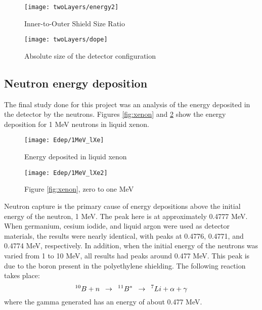 \documentclass[12pt]{article}
\begin{document}
\begin{figure}[H]
  \centering
  \begin{minipage}[t]{0.45\linewidth}
    \texttt{[image: twoLayers/energy2]}
    \caption{Inner-to-Outer Shield Size Ratio}
    \label{fig:energy2}
  \end{minipage}
  \quad
  \begin{minipage}[t]{0.45\linewidth}
    \texttt{[image: twoLayers/dope]}
    \caption{Absolute size of the detector configuration}
    \label{fig:dope}
  \end{minipage}
\end{figure}

\subsection{Neutron energy deposition}
The final study done for this project was an analysis of the energy deposited in the detector by the neutrons. Figures \ref{fig:xenon} and \ref{fig:xenon2} show the energy deposition for 1 MeV neutrons in liquid xenon.

\begin{figure}[H]
  \centering
  \begin{minipage}[t]{0.45\linewidth}
    \texttt{[image: Edep/1MeV\_lXe]}
    \caption{Energy deposited in liquid xenon}
    \label{fig:xenon}
  \end{minipage}
  \quad
  \begin{minipage}[t]{0.45\linewidth}
    \texttt{[image: Edep/1MeV\_lXe2]}
    \caption{Figure \ref{fig:xenon}, zero to one MeV}
    \label{fig:xenon2}
  \end{minipage}
\end{figure}

Neutron capture is the primary cause of energy depositions above the initial energy of the neutron, 1 MeV. The peak here is at approximately 0.4777 MeV. When germanium, cesium iodide, and liquid argon were used as detector materials, the results were nearly identical, with peaks at 0.4776, 0.4771, and 0.4774 MeV, respectively. In addition, when the initial energy of the neutrons was varied from 1 to 10 MeV, all results had peaks around 0.477 MeV. This peak is due to the boron present in the polyethylene shielding. The following reaction takes place:
$$^{10}B + n\hspace{0.5em}\rightarrow\hspace{0.5em}^{11}B^{*}\hspace{0.5em}\rightarrow\hspace{0.5em}^{7}Li + \alpha + \gamma$$
where the gamma generated has an energy of about 0.477 MeV.
\end{document}
